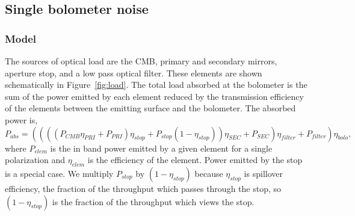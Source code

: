 \documentclass[]{spie}  %
\begin{document}
\subsection{Single bolometer noise}
\label{sec:det_noise}

\subsubsection{Model}

The sources of optical load are the CMB, primary and secondary mirrors, aperture stop, and a low pass optical filter.  These elements 
are shown schematically in Figure~\ref{fig:load}. 
%
The total load absorbed at the bolometer is the sum of the power emitted by each element reduced by the transmission efficiency of the elements between 
the emitting surface and the bolometer.  
The absorbed power is,
\begin{equation}
\label{eq:load}
P_{abs} =  (((( P_{CMB} \eta_{PRI} + P_{PRI} ) \eta_{stop} + P_{stop}(1-\eta_{stop}) ) \eta_{SEC} + P_{SEC})\eta_{filter} + P_{filter}) \eta_{bolo},
\end{equation} 
where $P_{elem}$ is the in band power emitted by a given element for a single polarization and $\eta_{elem}$ is the efficiency 
of the element. %
Power emitted by the stop is a special case. We multiply $P_{stop}$ by 
$(1-\eta_{stop})$ because $\eta_{stop}$ is spillover efficiency, the fraction of the throughput which passes through the stop, so $(1-\eta_{stop})$ 
is the fraction of the throughput which views the stop.  
\end{document}

